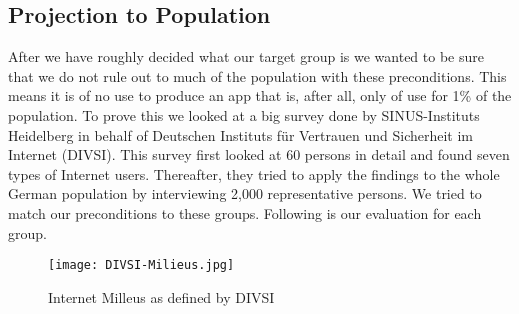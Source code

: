 \subsection{Projection to Population}
After we have roughly decided what our target group is we wanted to be sure that we do not rule out to much of the population with these preconditions.
This means it is of no use to produce an app that is, after all, only of use for 1\% of the population.
To prove this we looked at a big survey done by SINUS-Instituts Heidelberg in behalf of Deutschen Instituts f\"{u}r Vertrauen und Sicherheit im Internet (DIVSI).
This survey first looked at 60 persons in detail and found seven types of Internet users.
Thereafter, they tried to apply the findings to the whole German population by interviewing 2,000 representative persons.
We tried to match our preconditions to these groups. Following is our evaluation for each group\cite{divsi2012divsi}.

\begin{figure}[hHtbp]
\centering
\texttt{[image: DIVSI-Milieus.jpg]}
\caption{Internet Milleus as defined by DIVSI \cite{divsi2012divsi}}
\label{fig:divsi_milieus}
\end{figure}

